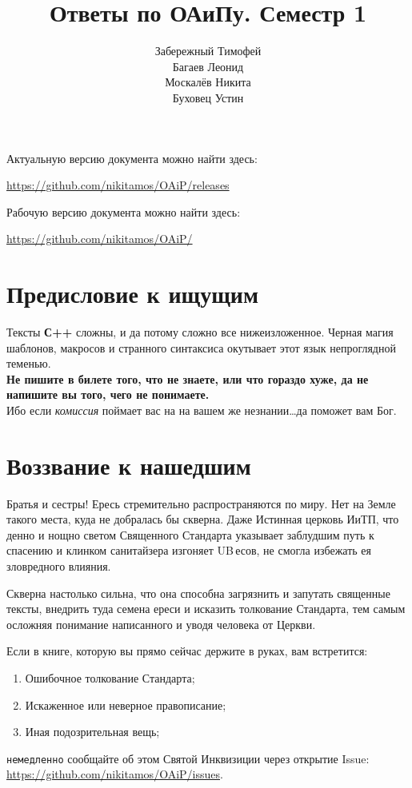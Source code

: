 \documentclass[12pt, a4paper]{extarticle}
\author{
  Забережный Тимофей \\
  Багаев     Леонид  \\
  Москалёв   Никита  \\
  Буховец    Устин   \\
}
\title{Ответы по ОАиПу. Семестр 1}
\begin{document}
\clearpage\maketitle
\thispagestyle{empty}

\vspace{15cm}

\begin{center}
  Актуальную версию документа можно найти здесь:

  \url{https://github.com/nikitamos/OAiP/releases}
  
  \vspace{5mm}
  Рабочую версию документа можно найти здесь:

  \url{https://github.com/nikitamos/OAiP/}
\end{center}

\newpage
\section*{Предисловие к ищущим}
\large{Тексты \textbf{С++} сложны, и да потому сложно все нижеизложенное.
Черная магия шаблонов, макросов и странного синтаксиса окутывает этот язык непроглядной теменью.}\\

\Large{\textbf{Не пишите в билете того, что не знаете, или что гораздо хуже, да не напишите вы того, чего не понимаете.}}\\

\large{Ибо если \textit{комиссия} поймает вас на на вашем же незнании\dots да поможет вам Бог.}

\section*{Воззвание к нашедшим}
Братья и сестры! Ересь стремительно распространяются по миру. Нет
на Земле такого места, куда не добралась бы скверна. Даже Истинная
церковь ИиТП, что денно и нощно светом Священного Стандарта указывает заблудшим
путь к спасению и клинком санитайзера изгоняет UB\,есов, не смогла избежать
ея зловредного влияния.

Скверна настолько сильна, что она способна загрязнить и запутать священные тексты,
внедрить туда семена ереси и исказить толкование Стандарта, тем самым осложняя
понимание написанного и уводя человека от Церкви. 

Если в книге, которую вы прямо сейчас держите в руках, вам встретится:
\begin{enumerate}
  \item Ошибочное толкование Стандарта;
  \item Искаженное или неверное правописание;
  \item Иная подозрительная вещь;
\end{enumerate}
\texttt{немедленно} сообщайте об этом Святой Инквизиции через открытие Issue:
\url{https://github.com/nikitamos/OAiP/issues}.
\end{document}
